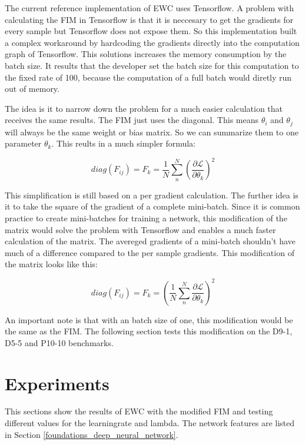 The current reference implementation of EWC uses Tensorflow.
A problem with calculating the FIM in Tensorflow is that it is neccesary to get the gradients for every sample but Tensorflow does not expose them.
So this implementation built a complex workaround by hardcoding the gradients directly into the computation graph of Tensorflow.
This solutions increases the memory consumption by the batch size.
It results that the developer set the batch size for this computation to the fixed rate of 100, because the computation of a full batch would diretly run out of memory.
\cite{github_ewc_issue1}




The idea is it to narrow down the problem for a much easier calculation that receives the same results.
The FIM just uses the diagonal.
This means $\theta_i$ and $\theta_j$ will always be the same weight or bias matrix.
So we can summarize them to one parameter $\theta_k$.
This reults in a much simpler formula:

$$diag \left(F_{ij}\right) = F_k = \frac{1}{N} \sum_{n}^{N} \left( \frac{\partial \mathcal{L}}{\partial \theta_{k}} \right)^2$$

This simplification is still  based on a per gradient calculation.
The further idea is it to take the square of the gradient of a complete mini-batch.
Since it is common practice to create mini-batches for training a network, this modification of the matrix would solve the problem with Tensorflow and enables a much faster calculation of the matrix.
The avereged gradients of a mini-batch shouldn't have much of a difference compared to the per sample gradients.
This modification of the matrix looks like this:

$$diag \left(F_{ij}\right) = F_k = \left( \frac{1}{N} \sum_{n}^{N} \frac{\partial \mathcal{L}}{\partial \theta_{k}} \right)^2$$

An important note is that with an batch size of one, this modification would be the same as the FIM. 
The following section tests this modification on the D9-1, D5-5 and P10-10 benchmarks.

\newpage
\section{Experiments}

This sections show the results of EWC with the modified FIM and testing different values for the learningrate and lambda.
The network features are listed in Section \ref{foundations_deep_neural_network}.

